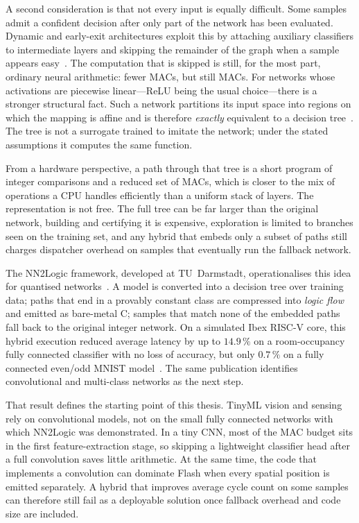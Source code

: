 A second consideration is that not every input is equally difficult.
Some samples admit a confident decision after only part of the network has been evaluated.
Dynamic and early-exit architectures exploit this by attaching auxiliary classifiers to intermediate layers and skipping the remainder of the graph when a sample appears easy~\cite{teerapittayanon2016branchynet,guo2025dynamic,wang2024earlyexit}.
The computation that is skipped is still, for the most part, ordinary neural arithmetic: fewer \acp{MAC}, but still \acp{MAC}.
For networks whose activations are piecewise linear---\ac{ReLU} being the usual choice---there is a stronger structural fact.
Such a network partitions its input space into regions on which the mapping is affine and is therefore \emph{exactly} equivalent to a decision tree~\cite{aytekin2022nns}.
The tree is not a surrogate trained to imitate the network; under the stated assumptions it computes the same function.

From a hardware perspective, a path through that tree is a short program of integer comparisons and a reduced set of \acp{MAC}, which is closer to the mix of operations a \ac{CPU} handles efficiently than a uniform stack of layers.
The representation is not free.
The full tree can be far larger than the original network, building and certifying it is expensive, exploration is limited to branches seen on the training set, and any hybrid that embeds only a subset of paths still charges dispatcher overhead on samples that eventually run the fallback network.

The NN2Logic framework, developed at TU~Darmstadt, operationalises this idea for quantised networks~\cite{stein2026nn2logic}.
A model is converted into a decision tree over training data; paths that end in a provably constant class are compressed into \emph{logic flow} and emitted as bare-metal C; samples that match none of the embedded paths fall back to the original integer network.
On a simulated Ibex \mbox{RISC-V} core, this hybrid execution reduced average latency by up to \(14.9\,\%\) on a room-occupancy fully connected classifier with no loss of accuracy, but only \(0.7\,\%\) on a fully connected even/odd MNIST model~\cite{deng2012mnist,stein2026nn2logic}.
The same publication identifies convolutional and multi-class networks as the next step.

That result defines the starting point of this thesis.
TinyML vision and sensing rely on convolutional models, not on the small fully connected networks with which NN2Logic was demonstrated.
In a tiny \ac{CNN}, most of the \ac{MAC} budget sits in the first feature-extraction stage, so skipping a lightweight classifier head after a full convolution saves little arithmetic.
At the same time, the code that implements a convolution can dominate Flash when every spatial position is emitted separately.
A hybrid that improves average cycle count on some samples can therefore still fail as a deployable solution once fallback overhead and code size are included.

